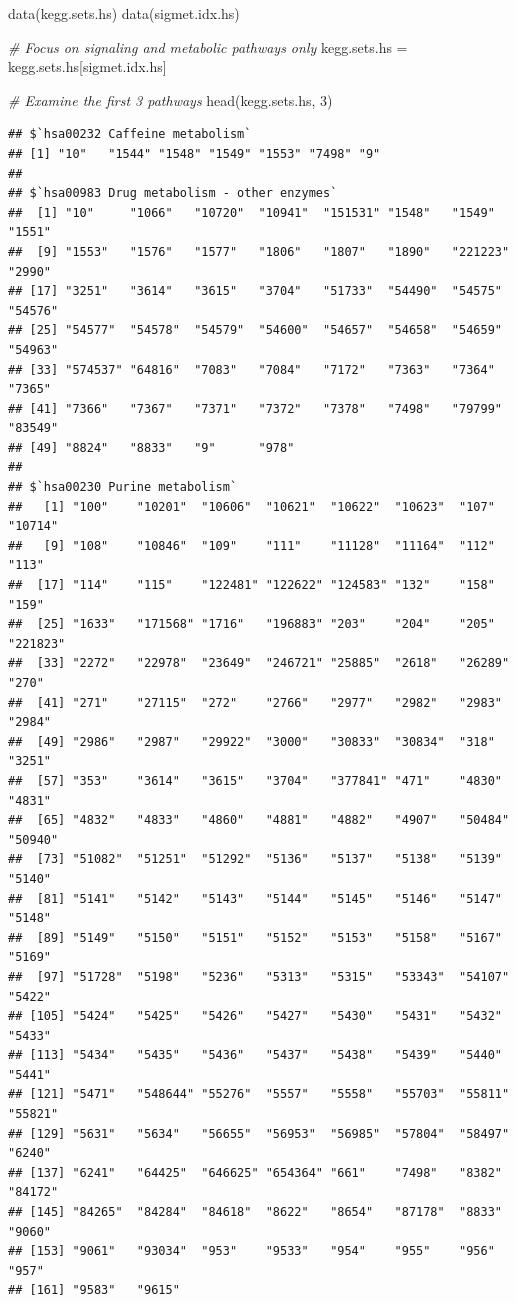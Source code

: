 \documentclass[
]{article}
\newenvironment{Shaded}{\begin{snugshade}}{\end{snugshade}}
\newcommand{\CommentTok}[1]{\textcolor[rgb]{0.56,0.35,0.01}{\textit{#1}}}
\newcommand{\DecValTok}[1]{\textcolor[rgb]{0.00,0.00,0.81}{#1}}
\newcommand{\FunctionTok}[1]{\textcolor[rgb]{0.00,0.00,0.00}{#1}}
\newcommand{\NormalTok}[1]{#1}
\newcommand{\OtherTok}[1]{\textcolor[rgb]{0.56,0.35,0.01}{#1}}
\begin{document}
\begin{Shaded}
\begin{Highlighting}[]
\FunctionTok{data}\NormalTok{(kegg.sets.hs)}
\FunctionTok{data}\NormalTok{(sigmet.idx.hs)}

\CommentTok{\# Focus on signaling and metabolic pathways only}
\NormalTok{kegg.sets.hs }\OtherTok{=}\NormalTok{ kegg.sets.hs[sigmet.idx.hs]}

\CommentTok{\# Examine the first 3 pathways}
\FunctionTok{head}\NormalTok{(kegg.sets.hs, }\DecValTok{3}\NormalTok{)}
\end{Highlighting}
\end{Shaded}

\begin{verbatim}
## $`hsa00232 Caffeine metabolism`
## [1] "10"   "1544" "1548" "1549" "1553" "7498" "9"   
## 
## $`hsa00983 Drug metabolism - other enzymes`
##  [1] "10"     "1066"   "10720"  "10941"  "151531" "1548"   "1549"   "1551"  
##  [9] "1553"   "1576"   "1577"   "1806"   "1807"   "1890"   "221223" "2990"  
## [17] "3251"   "3614"   "3615"   "3704"   "51733"  "54490"  "54575"  "54576" 
## [25] "54577"  "54578"  "54579"  "54600"  "54657"  "54658"  "54659"  "54963" 
## [33] "574537" "64816"  "7083"   "7084"   "7172"   "7363"   "7364"   "7365"  
## [41] "7366"   "7367"   "7371"   "7372"   "7378"   "7498"   "79799"  "83549" 
## [49] "8824"   "8833"   "9"      "978"   
## 
## $`hsa00230 Purine metabolism`
##   [1] "100"    "10201"  "10606"  "10621"  "10622"  "10623"  "107"    "10714" 
##   [9] "108"    "10846"  "109"    "111"    "11128"  "11164"  "112"    "113"   
##  [17] "114"    "115"    "122481" "122622" "124583" "132"    "158"    "159"   
##  [25] "1633"   "171568" "1716"   "196883" "203"    "204"    "205"    "221823"
##  [33] "2272"   "22978"  "23649"  "246721" "25885"  "2618"   "26289"  "270"   
##  [41] "271"    "27115"  "272"    "2766"   "2977"   "2982"   "2983"   "2984"  
##  [49] "2986"   "2987"   "29922"  "3000"   "30833"  "30834"  "318"    "3251"  
##  [57] "353"    "3614"   "3615"   "3704"   "377841" "471"    "4830"   "4831"  
##  [65] "4832"   "4833"   "4860"   "4881"   "4882"   "4907"   "50484"  "50940" 
##  [73] "51082"  "51251"  "51292"  "5136"   "5137"   "5138"   "5139"   "5140"  
##  [81] "5141"   "5142"   "5143"   "5144"   "5145"   "5146"   "5147"   "5148"  
##  [89] "5149"   "5150"   "5151"   "5152"   "5153"   "5158"   "5167"   "5169"  
##  [97] "51728"  "5198"   "5236"   "5313"   "5315"   "53343"  "54107"  "5422"  
## [105] "5424"   "5425"   "5426"   "5427"   "5430"   "5431"   "5432"   "5433"  
## [113] "5434"   "5435"   "5436"   "5437"   "5438"   "5439"   "5440"   "5441"  
## [121] "5471"   "548644" "55276"  "5557"   "5558"   "55703"  "55811"  "55821" 
## [129] "5631"   "5634"   "56655"  "56953"  "56985"  "57804"  "58497"  "6240"  
## [137] "6241"   "64425"  "646625" "654364" "661"    "7498"   "8382"   "84172" 
## [145] "84265"  "84284"  "84618"  "8622"   "8654"   "87178"  "8833"   "9060"  
## [153] "9061"   "93034"  "953"    "9533"   "954"    "955"    "956"    "957"   
## [161] "9583"   "9615"
\end{verbatim}
\end{document}
